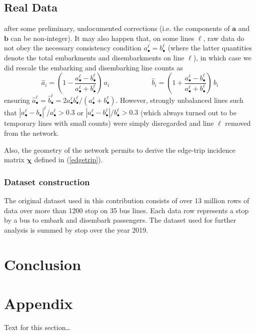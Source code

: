 \documentclass{bmcart}
\begin{document}
\subsection{Real Data}
\label{real_data}


after some preliminary, undocumented corrections (i.e. the components of $\mathbf{a}$ and $\mathbf{b}$ can be non-integer). It may also happen that, on some lines $\ell$,  raw data do not obey the necessary consistency condition  $a_\bullet^\ell=b_\bullet^\ell$ (where the latter quantities denote the total embarkments and disembarkments on line $\ell$), in which case we did rescale the embarking and disembarking line counts as 
\begin{displaymath}
	\hat{a}_i=(1-\frac{a_\bullet^\ell-b_\bullet^\ell}{a_\bullet^\ell+b_\bullet^\ell})\, a_i 
	\qquad\qquad\qquad
	\hat{b}_i=(1+\frac{a_\bullet^\ell-b_\bullet^\ell}{a_\bullet^\ell+b_\bullet^\ell})\,  b_i 
\end{displaymath}
ensuring $\hat{a}_\bullet^\ell=\hat{b}_\bullet^\ell=2a_\bullet^\ell b_\bullet^\ell/(a_\bullet^\ell+b_\bullet^\ell)$. However, strongly unbalanced lines such that  $|a_\bullet^\ell-b_\bullet|^\ell/a_\bullet^\ell > 0.3$ or $|a_\bullet^\ell-b_\bullet^\ell|/b_\bullet^\ell > 0.3$  (which always turned out to be temporary lines with small  counts) were simply disregarded and line $\ell$ removed from the network. 

Also, the geometry of the network permits to derive the edge-trip incidence matrix $\bm{\chi}$ defined in (\ref{edgetrip}). 

\subsubsection{Dataset construction}
The original dataset used in this contribution consists of over 13 million rows of data over more than 1200 stop on 35 bus lines. Each data row represents a stop by a bus to embark and disembark passengers. The dataset used for further analysis is summed by stop over the year 2019.


\section{Conclusion}

  
\newpage


\section*{Appendix}
Text for this section\ldots
\end{document}
